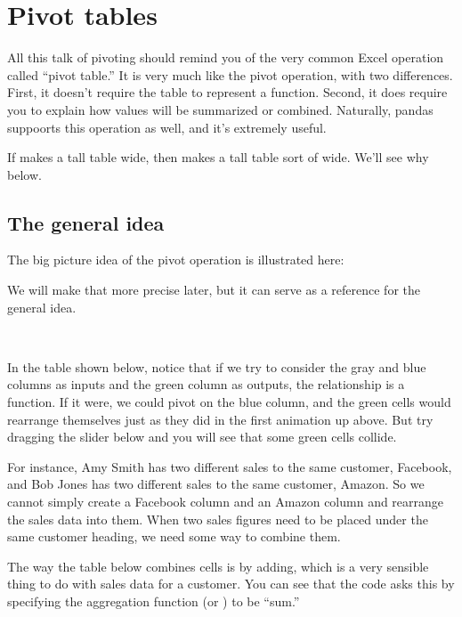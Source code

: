 \documentclass[letterpaper,10pt,english]{sphinxmanual}
\begin{document}
\section{Pivot tables}
\label{\detokenize{chapter-6-single-table-verbs:pivot-tables}}
All this talk of pivoting should remind you of the very common Excel operation called “pivot table.”  It is very much like the pivot operation, with two differences.  First, it doesn’t require the table to represent a function.  Second, it does require you to explain how values will be summarized or combined.  Naturally, pandas suppoorts this operation as well, and it’s extremely useful.

If  makes a tall table wide, then  makes a tall table sort of wide.  We’ll see why below.


\subsection{The general idea}
\label{\detokenize{chapter-6-single-table-verbs:id2}}
The big picture idea of the pivot operation is illustrated here:


We will make that more precise later, but it can serve as a reference for the general idea.

 

In the table shown below, notice that if we try to consider the gray and blue columns as inputs and the green column as outputs, the relationship is  a function.  If it were, we could pivot on the blue column, and the green cells would rearrange themselves just as they did in the first animation up above.  But try dragging the slider below  and you will see that some green cells collide.

For instance, Amy Smith has two different sales to the same customer, Facebook, and Bob Jones has two different sales to the same customer, Amazon.  So we cannot simply create a Facebook column and an Amazon column and rearrange the sales data into them.  When two sales figures need to be placed under the same customer heading, we need some way to combine them.

The way the table below combines cells is by adding, which is a very sensible thing to do with sales data for a customer.  You can see that the code asks this by specifying the aggregation function (or ) to be “sum.”
\end{document}
